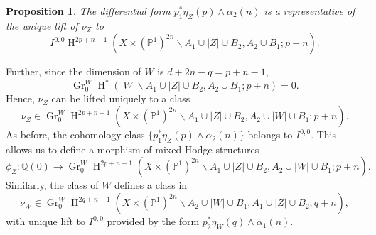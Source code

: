 \documentclass[11pt,a4paper]{amsart}
\renewcommand{\P}{\mathds{P}}
\newcommand{\Q}{\mathds{Q}}
\DeclareMathOperator {\Gr} {Gr}
\DeclareMathOperator{\rH}{H}
\numberwithin{equation}{section}
\theoremstyle{plain}
\newtheorem{prop}{Proposition}[section]
\theoremstyle{definition}
\begin{document}
\begin{prop}\label{prop:5-3-2} The differential form 
$p^{\ast}_{1}\eta_{Z}(p)\wedge \alpha_{2}(n)$ is a representative of  the
unique lift of $\nu_{Z}$ to
\begin{displaymath}
I^{0,0}\rH^{2p+n-1}(X\times (\P^{1})^{2n}\smallsetminus
  A_{1}\cup |Z|\cup B_{2},A_{2}\cup B_{1};p+n).
 \end{displaymath}
\end{prop}
Further, since the dimension of $W$ is
$d+2n-q=p+n-1$,
\begin{displaymath}
\Gr^{W}_{0}\rH^{\ast}(|W|\smallsetminus A_{1}\cup |Z|\cup B_{2}, A_{2}\cup B_{1};p+n)=0.
\end{displaymath}
Hence, $\nu_{Z}$ can be lifted uniquely to a class 
\begin{equation}\label{eq:5}
\nu_{Z}\in \Gr^{W}_{0}\rH^{2p+n-1}(X\times (\P^{1})^{2n}\smallsetminus
  A_{1}\cup |Z|\cup 
  B_{2},A_{2}\cup |W|\cup B_{1}; p+n).
\end{equation}
As before, the cohomology class
$\{p^{\ast}_{1}\eta_{Z}(p)\wedge\alpha_{2}(n)\}$
belongs to $I^{0,0}$. This allows us to define a morphism of mixed Hodge
structures
\begin{displaymath}
\phi_{Z}\colon \Q(0)\rightarrow \Gr^{W}_{0}\rH^{2p+n-1}(X\times (\P^{1})^{2n}\smallsetminus
  A_{1}\cup |Z|\cup 
  B_{2}, A_{2}\cup |W|\cup B_{1}; p+n).
  \end{displaymath}
Similarly, the class of $W$ defines a class in 
\begin{equation}\label{eq:8}
 \nu_{W}\in \Gr^{W}_{0}\rH^{2q+n-1}(X\times (\P^{1})^{2n}\smallsetminus
  A_{2}\cup |W|\cup 
  B_{1}, A_{1}\cup |Z|\cup B_{2}; q+n),
\end{equation}
with unique lift to $I^{0,0}$ provided by the form
$p^{\ast}_{2}\eta_{W}(q)\wedge\alpha_{1}(n)$.
\end{document}
